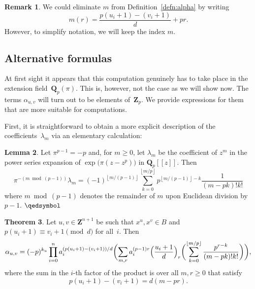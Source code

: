 \documentclass[a4paper,11pt]{article}
\numberwithin{equation}{section}
\providecommand{\floor}[1]{\left\lfloor#1\right\rfloor}   %
\newcommand{\ZZ}{\mathbf{Z}} %
\newcommand{\QQ}{\mathbf{Q}} %
\theoremstyle{definition}
\newtheorem{thm}{Theorem}[section]
\newtheorem{lem}[thm]{Lemma}
\newtheorem{rem}[thm]{Remark}
\begin{document}
\begin{rem}
We could eliminate $m$ from Definition~\ref{defn:alpha} by writing 
\[
m(r)=\frac{p(u_i+1) - (v_i+1)}{d}+pr.
\]
However, to simplify notation, we will keep the index $m$.
\end{rem}

\subsection{Alternative formulas}

At first sight it appears that this computation genuinely has to 
take place in the extension field~$\QQ_p(\pi)$.  This is, however, 
not the case as we will show now.  The terms $\alpha_{u,v}$ 
will turn out to be elements of~$\ZZ_p$. We provide expressions 
for them that are more suitable for computations.

First, it is straightforward to obtain a more explicit description 
of the coefficients~$\lambda_m$ via an elementary calculation:

\begin{lem} \label{lem:lambdam}
Let $\pi^{p-1} = -p$ and, for $m \geq 0$, let $\lambda_m$ 
be the coefficient of $z^m$ in the power series expansion 
of $\exp \bigl( \pi (z - z^p) \bigr)$ in $\QQ_p[[z]]$.  Then 
\begin{equation*}
\pi^{- (m \bmod{(p-1)})} \lambda_m = (-1)^{\floor{m/(p-1)}} \sum_{k=0}^{\floor{m/p}} p^{\floor{m/(p-1)} - k} \frac{1}{(m-pk)! k!}
\end{equation*}
where $m \bmod{(p-1)}$ denotes the remainder of $m$ upon Euclidean 
division by $p-1$. \hfill $\qedsymbol$
\end{lem}

\begin{thm} \label{thm:alpha}
Let $u, v \in \ZZ^{n+1}$ be such that 
$x^u, x^v \in B$ and 
$p (u_i + 1) \equiv v_i + 1 \pmod{d}$ for all~$i$. 
Then 
\begin{equation*}
\alpha_{u,v}=(-p)^{k_u} \prod_{i=0}^n a_i^{(p (u_i + 1) - (v_i + 1))/d} \biggl( \sum_{m,r} a_i^{(p-1)r}\Bigl( \frac{u_i+1}{d} \Bigr)_r \biggl( \sum_{k=0}^{\floor{m/p}} \frac{p^{r-k}}{(m-pk)!k!}  \biggr) \biggr),
\end{equation*}
where the sum in the $i$-th factor of the product is over all $m, r \geq 0$  
that satisfy
\[
p(u_i+1)-(v_i+1)=d(m-pr).
\]
\end{thm}
\end{document}
